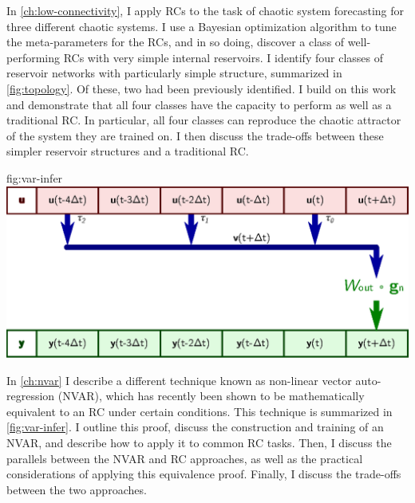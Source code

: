 In \cref{ch:low-connectivity}, I apply RCs to the task of chaotic
system forecasting for three different chaotic systems. I use a
Bayesian optimization algorithm to tune the meta-parameters for the
RCs, and in so doing, discover a class of well-performing RCs with
very simple internal reservoirs. I identify four classes of reservoir
networks with particularly simple structure, summarized in
\cref{fig:topology}. Of these, two had been previously identified. I
build on this work and demonstrate that all four classes have the
capacity to perform as well as a traditional RC. In particular, all
four classes can reproduce the chaotic attractor of the system they
are trained on. I then discuss the trade-offs between these simpler
reservoir structures and a traditional RC.

\begin{reusefigure}{fig:var-infer}
  \includegraphics{figures/var-infer}
  \caption{Summary of the (N)VAR method. Many time-delay taps $\tau_i$
    of the signal $\bm{u}(t)$ (top, red) are concatenated into the tap
    vector $\bm{v}(t)$ (middle, blue). Here, there are three taps
    $\tau_0=0$, $\tau_1=2$, and $\tau_2=4$. These taps are then passed
    through a possibly non-linear function $\bm{g}_\text{n}$ and
    combined linearly by the output matrix $W_\text{out}$ to produce
    the next value of the (N)VAR's output $\bm{y}(t)$ (bottom,
    green). For a linear VAR, $\bm{g}_\text{n}$ is the identity
    function. To transform a whole time series input, this (N)VAR process
    slides along the time axis from left to right.}
\end{reusefigure}

In \cref{ch:nvar} I describe a different technique known as non-linear
vector auto-regression (NVAR), which has recently been shown to be
mathematically equivalent to an RC under certain conditions.  This
technique is summarized in \cref{fig:var-infer}.  I outline this
proof, discuss the construction and training of an NVAR, and describe
how to apply it to common RC tasks. Then, I discuss the parallels
between the NVAR and RC approaches, as well as the practical
considerations of applying this equivalence proof. Finally, I discuss
the trade-offs between the two approaches.

